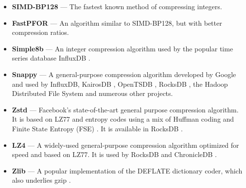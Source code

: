 \begin{itemize}[leftmargin=4mm]
\itemsep0mm
\item \textbf{SIMD-BP128} \cite{fastpfor} --- The fastest known method of compressing integers.
\item \textbf{FastPFOR} \cite{fastpfor} --- An algorithm similar to SIMD-BP128, but with better compression ratios.
\item \textbf{Simple8b} \cite{simple8b} --- An integer compression algorithm used by the popular time series database InfluxDB \cite{influxDB}.
\item \textbf{Snappy} \cite{snappy} --- A general-purpose compression algorithm developed by Google and used by InfluxDB, KairosDB \cite{kairosDB}, OpenTSDB \cite{openTSDB}, RocksDB \cite{rocksDB}, the Hadoop Distributed File System \cite{hdfs} and numerous other projects.
\item \textbf{Zstd} \cite{zstd} --- Facebook's state-of-the-art general purpose compression algorithm. It is based on LZ77 and entropy codes using a mix of Huffman coding and Finite State Entropy (FSE) \cite{fse}. It is available in RocksDB \cite{rocksDB}.
\item \textbf{LZ4} \cite{lz4} --- A widely-used general-purpose compression algorithm optimized for speed and based on LZ77. It is used by RocksDB and ChronicleDB \cite{chronicleDB}.
\item \textbf{Zlib} \cite{zlib} --- A popular implementation of the DEFLATE \cite{deflate} dictionary coder, which also underlies gzip \cite{gzip}.

\end{itemize}

